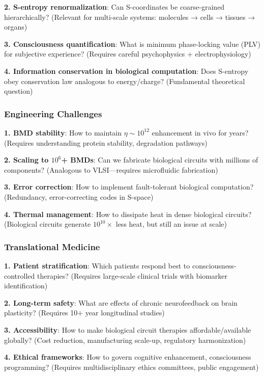\documentclass[11pt,a4paper]{article}
\begin{document}
\textbf{2. S-entropy renormalization}: Can S-coordinates be coarse-grained hierarchically? (Relevant for multi-scale systems: molecules → cells → tissues → organs)

\textbf{3. Consciousness quantification}: What is minimum phase-locking value (PLV) for subjective experience? (Requires careful psychophysics + electrophysiology)

\textbf{4. Information conservation in biological computation}: Does S-entropy obey conservation law analogous to energy/charge? (Fundamental theoretical question)

\subsubsection{Engineering Challenges}

\textbf{1. BMD stability}: How to maintain $\eta \sim 10^{12}$ enhancement in vivo for years? (Requires understanding protein stability, degradation pathways)

\textbf{2. Scaling to $10^6$+ BMDs}: Can we fabricate biological circuits with millions of components? (Analogous to VLSI—requires microfluidic fabrication)

\textbf{3. Error correction}: How to implement fault-tolerant biological computation? (Redundancy, error-correcting codes in S-space)

\textbf{4. Thermal management}: How to dissipate heat in dense biological circuits? (Biological circuits generate $10^{10}\times$ less heat, but still an issue at scale)

\subsubsection{Translational Medicine}

\textbf{1. Patient stratification}: Which patients respond best to consciousness-controlled therapies? (Requires large-scale clinical trials with biomarker identification)

\textbf{2. Long-term safety}: What are effects of chronic neurofeedback on brain plasticity? (Requires 10+ year longitudinal studies)

\textbf{3. Accessibility}: How to make biological circuit therapies affordable/available globally? (Cost reduction, manufacturing scale-up, regulatory harmonization)

\textbf{4. Ethical frameworks}: How to govern cognitive enhancement, consciousness programming? (Requires multidisciplinary ethics committees, public engagement)
\end{document}

